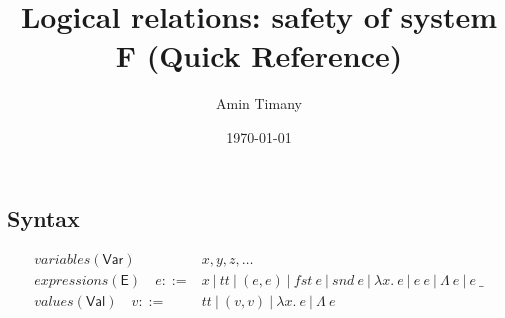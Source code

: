 \documentclass{article}
\title{Logical relations: safety of system F (Quick Reference)}
\author{Amin Timany}
\date{\today}
\newcommand{\gor}{~|~}
\newcommand{\fst}{\mathit{fst}}
\newcommand{\snd}{\mathit{snd}}
\newcommand{\TT}{\mathit{tt}}
\newcommand{\VAR}{\mathsf{Var}}
\newcommand{\EXP}{\mathsf{E}}
\newcommand{\VAL}{\mathsf{Val}}
\newcommand{\TArg}{\_}
\newcommand{\TLam}{\Lambda}
\newcommand{\expr}{e}
\newcommand{\val}{v}
\newcommand{\var}{x}
\newcommand{\varB}{y}
\newcommand{\varC}{z}
\begin{document}
\maketitle


\subsection*{Syntax}
\begin{align*}
\textit{variables} (\VAR) \hspace{1em} \phantom{\var ::={}}& \var, \varB, \varC, \dots\\
\textit{expressions} (\EXP) \hspace{1em} \expr ::={}& \var \gor \TT \gor (\expr, \expr)
\gor \fst~\expr \gor \snd~\expr \gor \lambda \var.~\expr \gor \expr~\expr
\gor \TLam~\expr \gor \expr~\TArg\\
\textit{values} (\VAL) \hspace{1em} \val ::={}& \TT \gor (\val, \val) \gor \lambda \var.~\expr
\gor \TLam~\expr
\end{align*}
\end{document}
